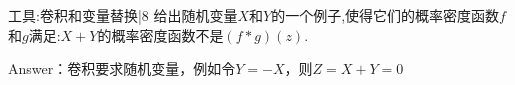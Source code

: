 \newChapter 工具:卷积和变量替换|8
\exer 给出随机变量$X$和$Y$的一个例子,使得它们的概率密度函数$f$和$g$满足:$X+Y$的概率密度函数不是$(f*g)(z)$.\par
Answer：卷积要求随机变量，例如令$Y=-X$，则$Z=X+Y=0$

